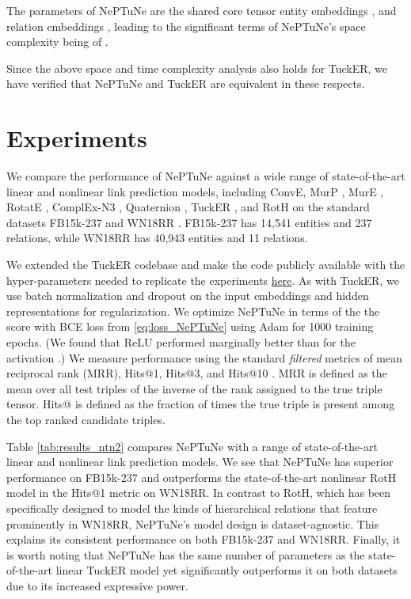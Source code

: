 \documentclass[11pt]{article}
\begin{document}
The parameters of NePTuNe are the shared core tensor  entity embeddings , and relation embeddings , leading to the significant terms of NePTuNe's space complexity being of . 

Since the above space and time complexity analysis also holds for TuckER, we have verified that NePTuNe and TuckER are equivalent in these respects.


\section{Experiments}

We compare the performance of NePTuNe against a wide range of state-of-the-art linear and nonlinear link prediction models, including ConvE\cite{dettmers2018convolutional}, MurP \cite{balazevic2019multi}, 
MurE \cite{balazevic2019multi}, 
RotatE \cite{sun2019rotate}, 
ComplEx-N3 \cite{lacroix2018canonical}, 
Quaternion \cite{NEURIPS2019_d961e9f2},
TuckER \cite{balavzevic2019tucker}, 
and RotH \cite{chami2020low} on the standard datasets 
FB15k-237 \cite{toutanova2015representing} and WN18RR \cite{dettmers2018convolutional}. 
FB15k-237 has 14,541 entities and 237 relations, while WN18RR has 40,943 entities and 11 relations.



We extended the TuckER codebase \cite{tucker_code} and make the code publicly available with the hyper-parameters needed to replicate the experiments \textcolor{blue}{\href{https://github.com/luffycodes/neptune}{here}}.
As with TuckER, we use batch normalization \cite{ioffe2015batch} and dropout \cite{srivastava2014dropout} on the input embeddings and hidden representations for regularization. 
We optimize NePTuNe in terms of the  the  score with BCE loss from \eqref{eq:loss_NePTuNe}
using Adam \cite{kingman2015adam} for 1000 training epochs. 
(We found that ReLU performed marginally better than  for the activation .)
We measure performance using the standard \textit{filtered} metrics of mean reciprocal rank (MRR), Hits@1, Hits@3, and Hits@10 \cite{bordes2013translating}. MRR is defined as the mean over all test triples of the inverse of the rank assigned to the true triple tensor. Hits@ is defined as the fraction of times the true triple is present among the top  ranked candidate triples.





Table \ref{tab:results_ntn2} compares NePTuNe with a range of state-of-the-art linear and nonlinear link prediction models.
We see that NePTuNe has superior performance on FB15k-237 and outperforms the state-of-the-art nonlinear RotH model \cite{chami2020low} in the Hits@1 metric on WN18RR.
In contrast to RotH, which has been specifically designed to model the kinds of hierarchical relations that feature prominently in WN18RR, NePTuNe's model design is dataset-agnostic. 
This explains its consistent performance on both FB15k-237 and WN18RR.
Finally, it is worth noting that NePTuNe has the same number of parameters as the state-of-the-art linear TuckER model yet significantly outperforms it on both datasets due to its increased expressive power.
\end{document}
